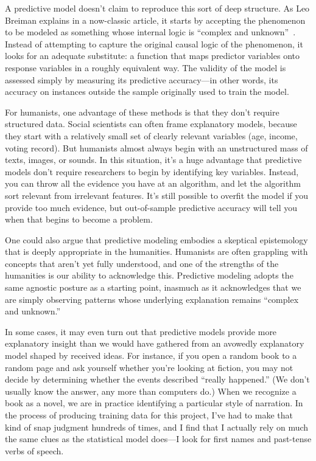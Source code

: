 \documentclass[paper=a4, fontsize=12pt]{scrartcl}
\numberwithin{equation}{section}		%
\numberwithin{figure}{section}			%
\numberwithin{table}{section}				%
\begin{document}
A predictive model doesn't claim to reproduce this sort of deep structure. As Leo Breiman explains in a now-classic article, it starts by accepting the phenomenon to be modeled as something whose internal logic is ``complex and unknown''~\cite{breiman:modeling}. Instead of attempting to capture the original causal logic of the phenomenon, it looks for an adequate substitute: a function that maps predictor variables onto response variables in a roughly equivalent way. The validity of the model is assessed simply by measuring its predictive accuracy---in other words, its accuracy on instances outside the sample originally used to train the model.

For humanists, one advantage of these methods is that they don't require structured data. Social scientists can often frame explanatory models, because they start with a relatively small set of clearly relevant variables (age, income, voting record). But humanists almost always begin with an unstructured mass of texts, images, or sounds. In this situation, it's a huge advantage that predictive models don't require researchers to begin by identifying key variables. Instead, you can throw all the evidence you have at an algorithm, and let the algorithm sort relevant from irrelevant features. It's still possible to overfit the model if you provide too much evidence, but out-of-sample predictive accuracy will tell you when that begins to become a problem.

One could also argue that predictive modeling embodies a skeptical epistemology that is deeply appropriate in the humanities. Humanists are often grappling with concepts that aren't yet fully understood, and one of the strengths of the humanities is our ability to acknowledge this. Predictive modeling adopts the same agnostic posture as a starting point, inasmuch as it acknowledges that we are simply observing patterns whose underlying explanation remains ``complex and unknown.''

In some cases, it may even turn out that predictive models provide more explanatory insight than we would have gathered from an avowedly explanatory model shaped by received ideas. For instance, if you open a random book to a random page and ask yourself whether you're looking at fiction, you may not decide by determining whether the events described ``really happened.'' (We don't usually know the answer, any more than computers do.) When we recognize a book as a novel, we are in practice identifying a particular style of narration. In the process of producing training data for this project, I've had to make that kind of snap judgment hundreds of times, and I find that I actually rely on much the same clues as the statistical model does---I look for first names and past-tense verbs of speech.
\end{document}
